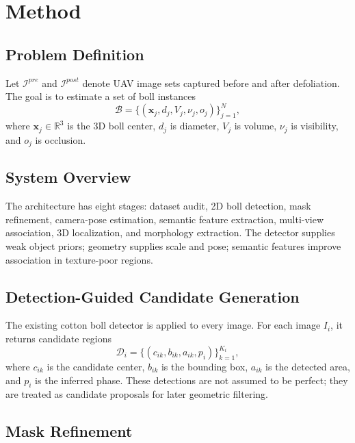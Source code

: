 \section{Method}

\subsection{Problem Definition}

Let $\mathcal{I}^{pre}$ and $\mathcal{I}^{post}$ denote UAV image sets captured before and after defoliation. The goal is to estimate a set of boll instances
\begin{equation}
\mathcal{B} = \{(\mathbf{x}_j, d_j, V_j, \nu_j, o_j)\}_{j=1}^{N},
\end{equation}
where $\mathbf{x}_j \in \mathbb{R}^3$ is the 3D boll center, $d_j$ is diameter, $V_j$ is volume, $\nu_j$ is visibility, and $o_j$ is occlusion.

\subsection{System Overview}

The architecture has eight stages: dataset audit, 2D boll detection, mask refinement, camera-pose estimation, semantic feature extraction, multi-view association, 3D localization, and morphology extraction. The detector supplies weak object priors; geometry supplies scale and pose; semantic features improve association in texture-poor regions.

\subsection{Detection-Guided Candidate Generation}

The existing cotton boll detector is applied to every image. For each image $I_i$, it returns candidate regions
\begin{equation}
\mathcal{D}_i = \{(c_{ik}, b_{ik}, a_{ik}, p_i)\}_{k=1}^{K_i},
\end{equation}
where $c_{ik}$ is the candidate center, $b_{ik}$ is the bounding box, $a_{ik}$ is the detected area, and $p_i$ is the inferred phase. These detections are not assumed to be perfect; they are treated as candidate proposals for later geometric filtering.

\subsection{Mask Refinement}

